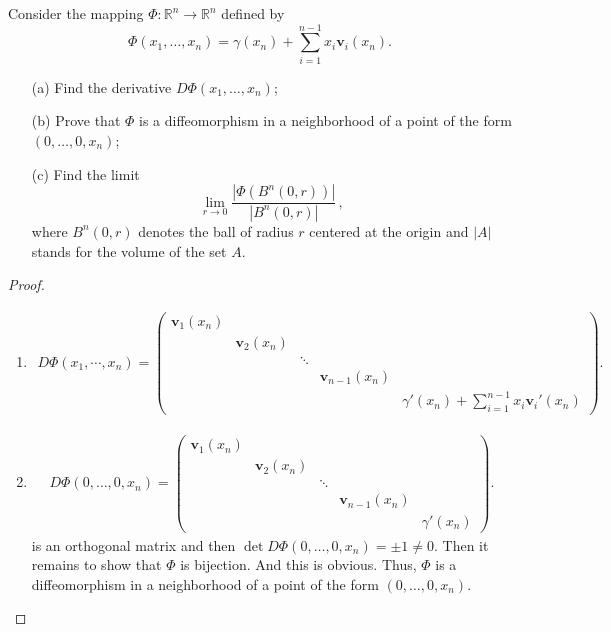 \documentclass[11pt]{article}
\theoremstyle{definition}
\theoremstyle{definition}
\begin{document}
Consider the mapping $\Phi:\mathbb{R}^n\to\mathbb{R}^n$ defined by
$$
\Phi(x_1,\ldots,x_n)=\gamma(x_n)+\sum_{i=1}^{n-1} x_i\mathbf{v}_i(x_n).
$$
\begin{itemize}
	\item[(a)] Find the derivative $D\Phi(x_1,\ldots,x_n)$;
	\item[(b)] Prove that $\Phi$ is a diffeomorphism in a neighborhood of a point of the form $(0,\ldots,0,x_n)$;
	\item[(c)] Find the limit
	$$
	\lim_{r\to 0}
	\frac{|\Phi(B^n(0,r))|}{|B^n(0,r)|}\, ,
	$$
	where $B^n(0,r)$ denotes the ball of radius $r$ centered at the origin and $|A|$ stands for the volume of the set $A$.
\end{itemize}
\begin{proof}
~\begin{enumerate}[label=(\alph*)]
    \item 
    \begin{align*}
        D\Phi(x_1,\cdots,x_n) = \begin{pmatrix}
            \mathbf{v}_1(x_n) &  &  &  &  \\
            & \mathbf{v}_2(x_n) &  &  &  \\
            &  & \ddots &  & \\
            &  &  & \mathbf{v}_{n-1}(x_n) \\
            &  &  &  & \gamma'(x_n) + \sum^{n-1}_{i=1}x_i \mathbf{v}_i'(x_n)
        \end{pmatrix}.
    \end{align*}
    
    \item 
    \begin{align*}
        D\Phi(0,\ldots, 0, x_n) = \begin{pmatrix}
            \mathbf{v}_1(x_n) &  &  &  &  \\
            & \mathbf{v}_2(x_n) &  &  &  \\
            &  & \ddots &  & \\
            &  &  & \mathbf{v}_{n-1}(x_n) \\
            &  &  &  & \gamma'(x_n)
        \end{pmatrix}.
    \end{align*}
    is an orthogonal matrix and then $\det D\Phi(0,\ldots, 0, x_n) = \pm 1 \neq 0$. Then it remains to show that $\Phi$ is bijection. And this is obvious. Thus, $\Phi$ is a diffeomorphism in a neighborhood of a point of the form $(0,\ldots,0,x_n)$.
    

\end{enumerate}
\end{proof}
\end{document}
